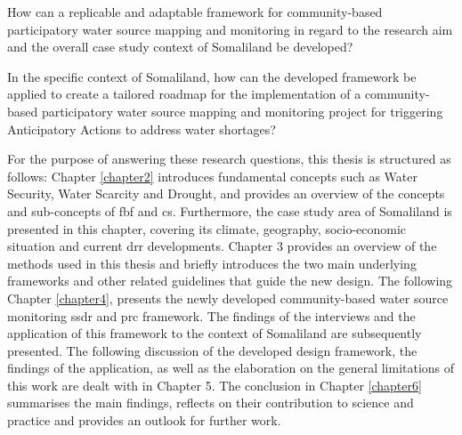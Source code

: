\begin{questions}
    \item How can a replicable and adaptable framework for community-based participatory water source mapping and monitoring in regard to the research aim and the overall case study context of Somaliland be developed?
    \item In the specific context of Somaliland, how can the developed framework be applied to create a tailored roadmap for the implementation of a community-based participatory water source mapping and monitoring project for triggering Anticipatory Actions to address water shortages?
\end{questions}

\noindent For the purpose of answering these research questions, this thesis is structured as follows: Chapter \ref{chapter2} introduces fundamental concepts such as Water Security, Water Scarcity and Drought, and provides an overview of the concepts and sub-concepts of \acrshort{fbf} and \acrshort{cs}. Furthermore, the case study area of Somaliland is presented in this chapter, covering its climate, geography, socio-economic situation and current \acrlong{drr} developments. Chapter 3 provides an overview of the methods used in this thesis and briefly introduces the two main underlying frameworks and other related guidelines that guide the new design. The following Chapter \ref{chapter4}, presents the newly developed community-based water source monitoring \acrfull{ssdr} and \acrfull{prc} framework. The findings of the interviews and the application of this framework to the context of Somaliland are subsequently presented. The following discussion of the developed design framework, the findings of the application, as well as the elaboration on the general limitations of this work are dealt with in Chapter 5. The conclusion in Chapter \ref{chapter6} summarises the main findings, reflects on their contribution to science and practice and provides an outlook for further work.
